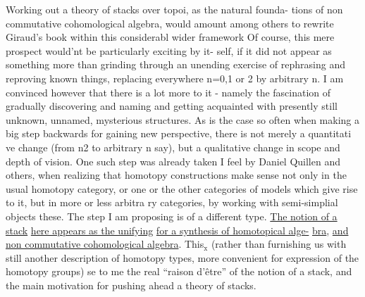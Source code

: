 Working out a theory of stacks over topoi, as the natural founda-%
tions of non commutative cohomological algebra, would amount among
others to rewrite Giraud's book within this considerabl wider framework
Of course, this mere prospect would'nt be particularly exciting by it-%
self, if it did not appear as something more than grinding through an
unending exercise of rephrasing and reproving known things, replacing
everywhere n=0,1 or 2 by arbitrary n. I am convinced however that there
is a lot more to it - namely the fascination of gradually discovering
and naming and getting acquainted with presently still unknown, unnamed,
mysterious structures. As is the case so often when making a big step
backwards for gaining new perspective, there is not merely a quantitati
ve change (from n\hand{$\leqslant$}2 to arbitrary n say), but a qualitative change in
scope and depth of vision. One such step was already taken I feel by
Daniel Quillen and others, when realizing that homotopy constructions
make sense not only in the usual homotopy category, or  one or the other
categories of models which give rise to it, but in more or less arbitra
\margin{-}ry categories, by working with semi-simplial objects  these. The
step I am proposing is of a  different type. \uline{The notion of a stack}
\uline{here appears as the unifying}  \uline{for a synthesis of homotopical alge-}%
\uline{bra}, \uline{and non commutative cohomological algebra}. This$_{\text{x}}$  (rather
than  furnishing us with still another description of homotopy types,
more convenient for expression of the homotopy groups) se to me the
real ``raison d'être'' of the notion of a stack, and the main motivation
for pushing ahead a theory of stacks.
